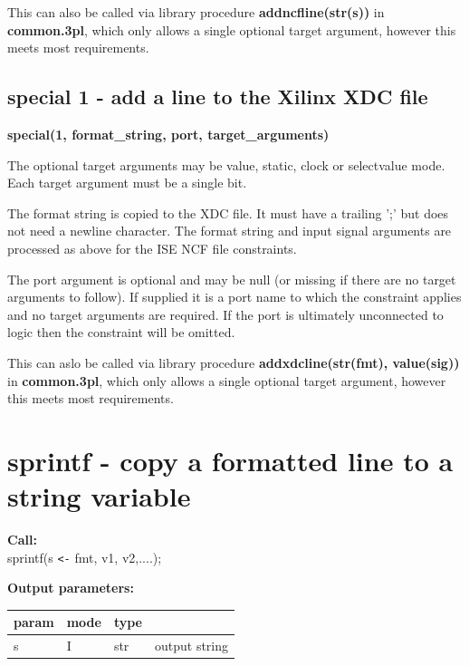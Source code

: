             This can also be called via library procedure
            {\bf addncfline(str(s))}  in
            {\bf common.3pl}, which only allows a
            single optional target argument, however this meets most requirements.


        \subsection{special 1 - add a line to the Xilinx XDC file}

            {\bf special(1, format\_string, port, target\_arguments)}
            
            The optional target arguments may be value, static, clock or
            selectvalue mode. Each target argument must be a single bit.
            
            The format string is copied to the XDC file. It must have a trailing
            ';' but does not need a newline character. The format string
            and input signal arguments are processed as above for the ISE
            NCF file constraints.
            
            The port argument is optional and may be null (or missing if there
            are no target arguments to follow). If supplied it is a port name
            to which the constraint applies and no target arguments are required.
            If the port is ultimately unconnected to logic then the constraint
            will be omitted.

            This can aslo be called via library procedure
            {\bf addxdcline(str(fmt), value(sig))}  in
            {\bf common.3pl}, which only allows a
            single optional target argument, however this meets most requirements.
        







    \section{sprintf - copy a formatted line to a string variable}\label{sec:ipsprintf}

        {\bf Call:} \\
        sprintf(s \verb'<-' fmt, v1, v2,....);
        
        {\bf Output parameters:} \\
        \begin{tabular}{| l | l | l | l |}
        \hline
        param  & mode     & type  & \\
        \hline \hline
        s & I & str & output string   \\ \hline
        \end{tabular}
        
